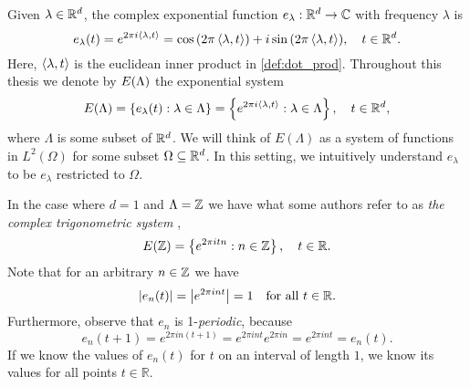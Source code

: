 \documentclass[../thesis.tex]{subfiles}
\begin{document}
Given $\lambda \in \mathbb{R}^d$, the complex exponential function $e_{\lambda}: \mathbb{R}^d \rightarrow \mathbb{C}$ with frequency $\lambda$ is 
\begin{equation*}
    e_{\lambda}(t) = e^{2 \pi i \langle \lambda, t \rangle} = \cos{\left(2 \pi \left \langle \lambda,t \right \rangle\right)} + i \sin{\left(2 \pi \left \langle \lambda,t \right \rangle\right)}, \quad t\in \mathbb{R}^d.
\end{equation*}
Here, $\left \langle \lambda, t \right \rangle$ is the euclidean inner product in \cref{def:dot_prod}. Throughout this thesis we denote by $E(\Lambda)$ the exponential system
\begin{equation*}
    E(\Lambda) = \left\{e_\lambda(t) : \lambda \in \Lambda\right\} = \left\{e^{2\pi i \left \langle \lambda,t \right \rangle} : \lambda \in \Lambda\right\}, \quad t\in \mathbb{R}^d,
\end{equation*}
where $\Lambda$ is some subset of $\mathbb{R}^d$. We will think of $E(\Lambda)$ as a system of functions in $L^2(\Omega)$ for some subset $\Omega \subseteq \mathbb{R}^d$. In this setting, we intuitively understand $e_\lambda$ to be $e_\lambda$ restricted to $\Omega$. %

\begin{example}
    In the case where $d=1$ and $\Lambda = \mathbb{Z}$ we have what some authors refer to as \emph{the complex trigonometric system} \cite{heilMetricsNormsInner2018} \cite{encyclopediaofmathematicsTrigonometricSystem},
    \begin{equation*}
        E(\mathbb{Z}) = \left\{e^{2\pi i t n} : n \in \mathbb{Z}\right\}, \quad t\in \mathbb{R}.
    \end{equation*}
    Note that for an arbitrary $n \in \mathbb{Z}$ we have
    \begin{equation*}
        \left|e_{n}(t) \right|= \left|e^{2 \pi i n t}\right| = 1 \quad \text{for all } t\in \mathbb{R}.
    \end{equation*}
    Furthermore, observe that $e_n$ is 1-\emph{periodic}, because
    \begin{equation*}
        e_n(t+1) = e^{2 \pi i n (t+1)} = e^{2 \pi i n t} e^{2 \pi i n} = e^{2 \pi i n t} = e_n(t).
    \end{equation*}
    If we know the values of $e_n(t)$ for $t$ on an interval of length $1$, we know its values for all points $t\in \mathbb{R}$. %
\end{example}
\end{document}
